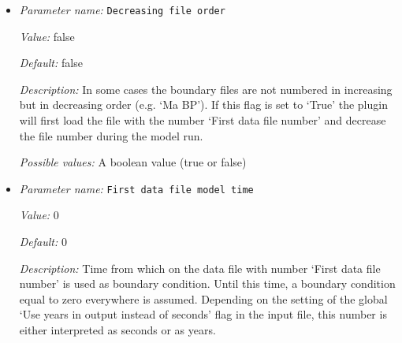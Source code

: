 \begin{itemize}
{\it Value:} 1e6


{\it Default:} 1e6


{\it Description:} Time step between following data files. Depending on the setting of the global `Use years in output instead of seconds' flag in the input file, this number is either interpreted as seconds or as years. The default is one million, i.e., either one million seconds or one million years.


{\it Possible values:} A floating point number $v$ such that $0 \leq v \leq \text{MAX\_DOUBLE}$
\item {\it Parameter name:} {\tt Decreasing file order}
\label{parameters:Boundary temperature model/Ascii data model/Decreasing file order}
\label{parameters:Boundary_20temperature_20model/Ascii_20data_20model/Decreasing_20file_20order}


{\it Value:} false


{\it Default:} false


{\it Description:} In some cases the boundary files are not numbered in increasing but in decreasing order (e.g. `Ma BP'). If this flag is set to `True' the plugin will first load the file with the number `First data file number' and decrease the file number during the model run.


{\it Possible values:} A boolean value (true or false)
\item {\it Parameter name:} {\tt First data file model time}
\label{parameters:Boundary temperature model/Ascii data model/First data file model time}
\label{parameters:Boundary_20temperature_20model/Ascii_20data_20model/First_20data_20file_20model_20time}


{\it Value:} 0


{\it Default:} 0


{\it Description:} Time from which on the data file with number `First data file number' is used as boundary condition. Until this time, a boundary condition equal to zero everywhere is assumed. Depending on the setting of the global `Use years in output instead of seconds' flag in the input file, this number is either interpreted as seconds or as years.



\end{itemize}
